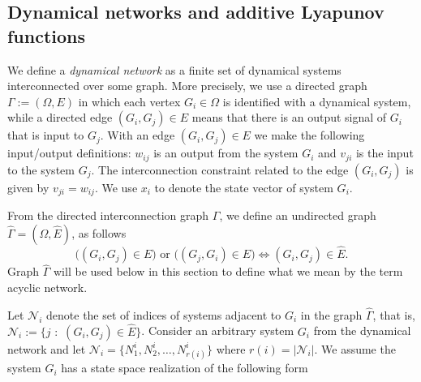 \documentclass[11pt,a4paper,oneside,DIV=12,headings=small]{scrartcl}
\newcommand{\cN}{\mathcal{N}}
\theoremstyle{plain}
\begin{document}
\subsection{Dynamical networks and additive Lyapunov functions}
\label{Sec4_A}
We define a \emph{dynamical network} as a finite set of dynamical systems interconnected over some graph. More precisely, we use a directed graph $\Gamma:=(\Omega,E)$ in which each vertex $G_i \in \Omega$ is identified with a dynamical system, while a directed edge $(G_i, G_j) \in E$ means that there is an output signal of $G_i$ that is input to $G_j$. 
With an edge $(G_i, G_j) \in E$ we make the following input/output definitions: $w_{ij}$ is an output from the system $G_i$ and $v_{ji}$ is the input to the system $G_j$. The interconnection constraint related to the edge $(G_i, G_j)$ is given by $v_{ji}=w_{ij}$. We use $x_i$ to denote the state vector of system $G_i$.



From the directed interconnection graph $\Gamma$, we define an undirected graph $\hat{\Gamma}=(\Omega,\hat{E})$, as follows
\begin{equation}
 \Big((G_i,G_j) \in E\Big)\,\, \text{or}\,\, \Big( (G_j,G_i) \in E \Big) \Longleftrightarrow (G_i,G_j) \in \hat{E}. \nonumber
\end{equation}
Graph $\hat{\Gamma}$ will be used below in this section to define what we mean by the term acyclic network.

Let $\cN_i$ denote the set of indices of systems adjacent to $G_i$ in the graph $\hat{\Gamma}$, that is, $\cN_i:=\{j \,\, : \,\, (G_i,G_j) \in \hat{E}\}$. Consider an arbitrary system $G_i$ from the dynamical network and let $\cN_i=\{N_1^i,N_2^i,\ldots,N_{r(i)}^i\}$ where $r(i)=|\cN_i|$. We assume the system $G_i$ has a state space realization of the following form
 
\end{document}
